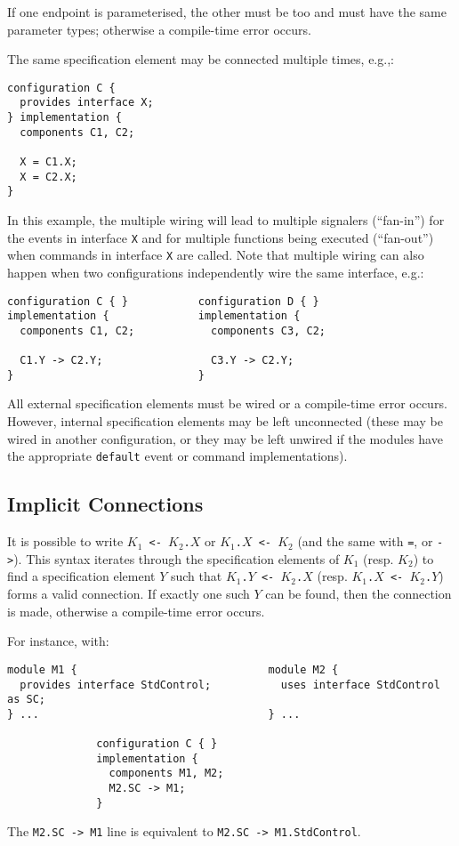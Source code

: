\documentclass[11pt]{article}
\newcommand{\kw}[1]{{\tt #1}}
\newcommand{\code}[1]{{\tt #1}}
\begin{document}
If one endpoint is parameterised, the other must be too and must have the
same parameter types; otherwise a compile-time error occurs.

The same specification element may be connected multiple times, e.g.,:
\begin{verbatim}
configuration C {
  provides interface X;
} implementation {
  components C1, C2;

  X = C1.X;
  X = C2.X;
}
\end{verbatim}
In this example, the multiple wiring will lead to multiple signalers
(``fan-in'') for the events in interface \code{X} and for multiple
functions being executed (``fan-out'') when commands in interface \code{X}
are called. Note that multiple wiring can also happen when two
configurations independently wire the same interface, e.g.:
\begin{verbatim}
configuration C { }           configuration D { }
implementation {              implementation {
  components C1, C2;            components C3, C2;

  C1.Y -> C2.Y;                 C3.Y -> C2.Y;
}                             }
\end{verbatim}

All external specification elements must be wired or a compile-time error
occurs. However, internal specification elements may be left unconnected
(these may be wired in another configuration, or they may be left unwired
if the modules have the appropriate \kw{default} event or command
implementations).

\subsection{Implicit Connections}
\label{sec:implicit}

It is possible to write \code{$K_1$ <- $K_2$.$X$} or \code{$K_1$.$X$ <-
$K_2$} (and the same with \kw{=}, or \kw{->}). This syntax iterates through
the specification elements of $K_1$ (resp. $K_2$) to find a specification
element $Y$ such that \code{$K_1$.$Y$ <- $K_2$.$X$} (resp. \code{$K_1$.$X$
<- $K_2$.$Y$}) forms a valid connection. If exactly one such $Y$ can
be found, then the connection is made, otherwise a compile-time error
occurs.

For instance, with:
\begin{verbatim}
module M1 {                              module M2 {
  provides interface StdControl;           uses interface StdControl as SC;
} ...                                    } ...

              configuration C { }
              implementation {
                components M1, M2;
                M2.SC -> M1;
              }
\end{verbatim}
The \code{M2.SC -> M1} line is equivalent to \code{M2.SC -> M1.StdControl}.
\end{document}
